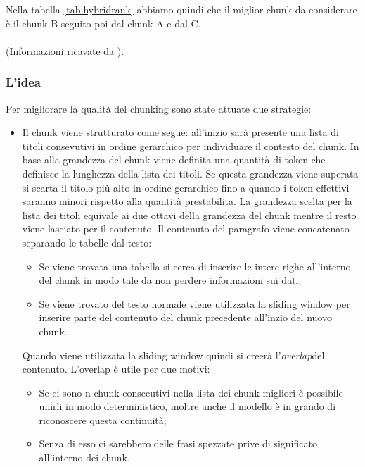\noindent Nella tabella \ref{tab:hybridrank} abbiamo quindi che il miglior chunk da considerare è il chunk B seguito poi dal chunk A e dal C.\\
\\
\noindent (Informazioni ricavate da \cite{site:weaviate-hybrid-search}).

\subsubsection{L'idea}
\label{subsubsec:ideachunking}
Per migliorare la qualità del chunking sono state attuate due strategie:
\begin{itemize}
    \item Il chunk viene strutturato come segue: all'inizio sarà presente una lista di titoli consevutivi in ordine gerarchico per individuare il contesto del chunk. In base alla grandezza del chunk viene definita una quantità di token che definisce la lunghezza della lista dei titoli. Se questa grandezza viene superata si scarta il titolo più alto in ordine gerarchico fino a quando i token effettivi saranno minori rispetto alla quantità prestabilita.
    La grandezza scelta per la lista dei titoli equivale ai due ottavi della grandezza del chunk mentre il resto viene lasciato per il contenuto.
    \noindent Il contenuto del paragrafo viene concatenato separando le tabelle dal testo:
    \begin{itemize}
        \item Se viene trovata una tabella si cerca di inserire le intere righe all'interno del chunk in modo tale da non perdere informazioni sui dati;
        \item Se viene trovato del testo normale viene utilizzata la sliding window per inserire parte del contenuto del chunk precedente all'inzio del nuovo chunk.
    \end{itemize}

    Quando viene utilizzata la sliding window quindi si creerà l'\emph{\gls{overlap}}\glsfirstoccur del contenuto.
    L'overlap è utile per due motivi:
    \begin{itemize}
        \item Se ci sono n chunk consecutivi nella lista dei chunk migliori è possibile unirli in modo deterministico, inoltre anche il modello è in grando di riconoscere questa continuità;
        \item Senza di esso ci sarebbero delle frasi spezzate prive di significato all'interno dei chunk.
    \end{itemize}


\end{itemize}
